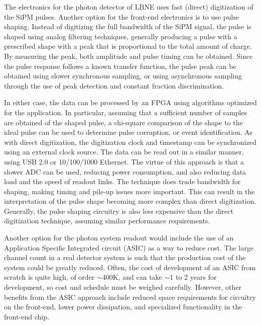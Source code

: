 The electronics for the photon detector of LBNE uses fast (direct)
digitization of the SiPM pulses. Another option for the front-end
electronics is to use pulse shaping. Instead of digitizing the full
bandwidth of the SiPM signal, the pulse is shaped using analog
filtering techniques, generally producing a pulse with a prescribed
shape with a peak that is proportional to the total amount of charge.
By measuring the peak, both amplitude and pulse timing can be
obtained.  Since the pulse response follows a known transfer function,
the pulse peak can be obtained using slower synchronous sampling, or
using asynchronous sampling through the use of peak detection and
constant fraction discrimination.  

In either case, the data can be
processed by an FPGA using algorithms optimized for the application.
In particular, assuming that a sufficient number of samples are
obtained of the shaped pulse, a chi-square comparison of the shape to
the ideal pulse can be used to determine pulse corruption, or event
identification.  As with direct digitization, the digitization clock
and timestamp can be synchronized using an external clock source. The
data can be read out in a similar manner, using USB 2.0 or 10/100/1000
Ethernet.  The virtue of this approach is that a slower ADC can be
used, reducing power consumption, and also reducing data load and the
speed of readout links.  The technique does trade bandwidth for
shaping, making timing and pile-up issues more important.  This can
result in the interpretation of the pulse shape becoming more complex
than direct digitization.  Generally, the pulse shaping circuitry is
also less expensive than the direct digitization technique, assuming
similar performance requirements.

Another option for the photon system readout would include the use 
of an Application Specific Integrated circuit (ASIC) as a way to
reduce cost.  The large channel count in a real detector system is
such that the production cost of the system could be greatly reduced.
Often, the cost of development of an ASIC from scratch is quite high,
of order $\sim$400K, and can take $\sim$1 to 2 years for development, so cost
and schedule must be weighed carefully.  However, other benefits from
the ASIC approach include reduced space requirements for circuitry on
the front-end, lower power dissipation, and specialized functionality
in the front-end chip.  

